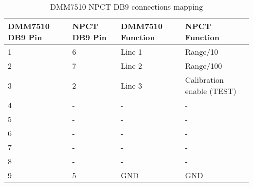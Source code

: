 \documentclass[paper=a4, fontsize=11pt]{scrartcl}
\numberwithin{figure}{section}			%
\numberwithin{table}{section}			%
\begin{document}
\begin{table}
	\center
	\caption{DMM7510-NPCT DB9 connections mapping}
	\begin{tabular}{m{2cm} m{2cm} m{4cm} m{6cm}}
		\bfseries DMM7510 DB9 Pin & \bfseries NPCT DB9 Pin & \bfseries DMM7510 Function & \bfseries NPCT Function \\ \hline
		1 & 6 & Line 1 & Range/10 \\ \hline
		2 & 7 & Line 2 & Range/100 \\ \hline
		3 & 2 & Line 3 & Calibration enable (TEST) \\ \hline
		4 & - & - & - \\ \hline
		5 & - & - & - \\ \hline
		6 & - & - & - \\ \hline
		7 & - & - & - \\ \hline
		8 & - & - & - \\ \hline
		9 & 5 & GND & GND \\ \hline
	\end{tabular}
\end{table}

\end{document}
